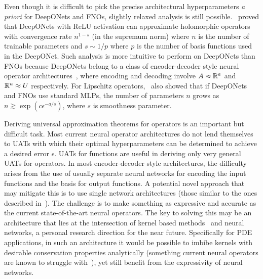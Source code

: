 Even though it is difficult to pick the precise architectural hyperparameters \emph{a priori} for DeepONets and FNOs, slightly relaxed analysis is still possible.~\citep{herrmann2024neural} proved that DeepONets with ReLU activation can approximate holomorphic operators with convergence rate $n^{1-s}$ (in the supremum norm) where $n$ is the number of trainable parameters and $s \sim 1/p$ where $p$ is the number of basis functions used in the DeepONet. Such analysis is more intuitive to perform on DeepONets than FNOs because DeepONets belong to a class of encoder-decoder style neural operator architectures~\citep{kovachki2024operator}, where encoding and decoding involve $A \approx \mathbb{R}^a$ and $\mathbb{R}^u \approx U$ respectively. For Lipschitz operators,~\citep{kovachki2024operator} also showed that if DeepONets and FNOs use standard MLPs, the number of parameters $n$ grows as $n \gtrsim \exp(c \epsilon^{-a/s})$, where $s$ is smoothness parameter.

Deriving universal approximation theorems for operators is an important but difficult task. Most current neural operator architectures do not lend themselves to UATs with which their optimal hyperparameters can be determined to achieve a desired error $\epsilon$. UATs for functions are useful in deriving only very general UATs for operators. In most encoder-decoder style architectures, the difficulty arises from the use of usually separate neural networks for encoding the input functions and the basis for output functions. A potential novel approach that may mitigate this is to use single network architectures (those similar to the ones described in~\citep{chen1995universal}). The challenge is to make something as expressive and accurate as the current state-of-the-art neural operators. The key to solving this may be an architecture that lies at the intersection of kernel based methods~\cite{batlle2024kernel} and neural networks, a personal research direction for the near future. Specifically for PDE applications, in such an architecture it would be possible to imbibe kernels with desirable conservation properties analytically (something current neural operators are known to struggle with~\citep{khorrami2024physics}), yet still benefit from the expressivity of neural networks.
%
\pagebreak
